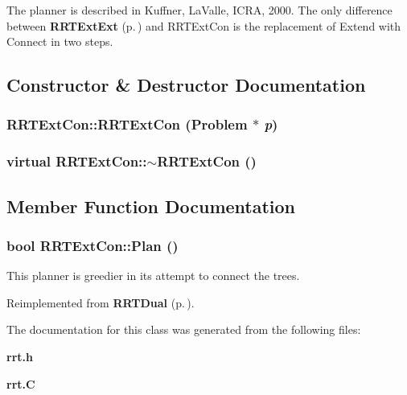 The planner is described in Kuffner, La\-Valle, ICRA, 2000. The only difference between {\bf RRTExt\-Ext} {\rm (p.\,\pageref{classRRTExtExt})} and RRTExt\-Con is the replacement of Extend with Connect in two steps. 



\subsection{Constructor \& Destructor Documentation}
\subsubsection{\setlength{\rightskip}{0pt plus 5cm}RRTExt\-Con::RRTExt\-Con ({\bf Problem} $\ast$ {\em p})}\label{classRRTExtCon_a0}


\subsubsection{\setlength{\rightskip}{0pt plus 5cm}virtual RRTExt\-Con::$\sim$RRTExt\-Con ()\hspace{0.3cm}{\tt  [inline, virtual]}}\label{classRRTExtCon_a1}




\subsection{Member Function Documentation}
\subsubsection{\setlength{\rightskip}{0pt plus 5cm}bool RRTExt\-Con::Plan ()\hspace{0.3cm}{\tt  [virtual]}}\label{classRRTExtCon_a2}


This planner is greedier in its attempt to connect the trees.



Reimplemented from {\bf RRTDual} {\rm (p.\,\pageref{classRRTDual_a2})}.

The documentation for this class was generated from the following files:\begin{CompactItemize}
\item 
{\bf rrt.h}\item 
{\bf rrt.C}\end{CompactItemize}
